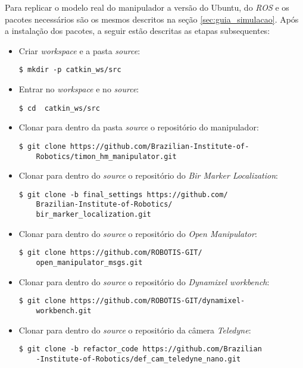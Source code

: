 Para replicar o modelo real do manipulador a versão do Ubuntu, do \textit{\acs{ROS}} e os pacotes necessários são os mesmos descritos na seção \ref{sec:guia_simulacao}. Após a instalação dos pacotes, a seguir estão descritas as etapas subsequentes:

\begin{itemize}
  \item Criar \textit{workspace} e a pasta \textit{source}:
  \begin{lstlisting}[frame=single]
    $ mkdir -p catkin_ws/src
  \end{lstlisting} 
  \item Entrar no \textit{workspace} e no \textit{source}:
  \begin{lstlisting}[frame=single]
    $ cd  catkin_ws/src
  \end{lstlisting} 
  \item Clonar para dentro da pasta \textit{source} o repositório do manipulador:
  \begin{lstlisting}[frame=single]
    $ git clone https://github.com/Brazilian-Institute-of-
    Robotics/timon_hm_manipulator.git 
  \end{lstlisting}
  \item Clonar para dentro do \textit{source} o repositório do \textit{Bir Marker Localization}:
  \begin{lstlisting}[frame=single]
    $ git clone -b final_settings https://github.com/
    Brazilian-Institute-of-Robotics/
    bir_marker_localization.git
  \end{lstlisting}  
  \item Clonar para dentro do \textit{source} o repositório do \textit{Open Manipulator}:
  \begin{lstlisting}[frame=single]
    $ git clone https://github.com/ROBOTIS-GIT/
    open_manipulator_msgs.git
  \end{lstlisting} 
  \item Clonar para dentro do \textit{source} o repositório do \textit{Dynamixel workbench}:
  \begin{lstlisting}[frame=single]
    $ git clone https://github.com/ROBOTIS-GIT/dynamixel-
    workbench.git
  \end{lstlisting}
  \item Clonar para dentro do \textit{source} o repositório da câmera \textit{Teledyne}:
  \begin{lstlisting}[frame=single]
    $ git clone -b refactor_code https://github.com/Brazilian
    -Institute-of-Robotics/def_cam_teledyne_nano.git
  \end{lstlisting}


\end{itemize}
